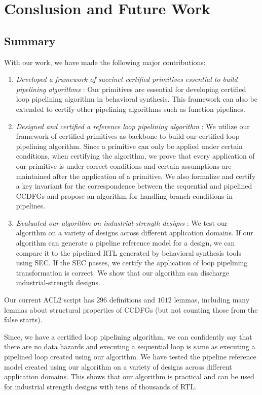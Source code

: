 \section{Conslusion and Future Work}
\label{sec:research-plan}

\subsection{Summary}
With our work, we have made the following major contributions:
\begin{enumerate}
\item {\em Developed a framework of succinct certified primitives essential to build pipelining algorithms} : Our primitives are essential for developing certified loop pipelining algorithm in behavioral synthesis. This framework can also be extended to certify other pipelining algorithms such as function pipelines.
\item {\em Designed and certified a reference loop pipelining algorithm} : We utilize our framework of certified primitives as backbone to build our certified loop pipelining algorithm. Since a primitive can only be applied under certain conditions, when certifying the algorithm, we prove that every application of our primitive is under correct conditions and certain assumptions are maintained after the application of a primitive. We also formalize and certify a key invariant for the correspondence between the sequential and pipelined CCDFGs and propose an algorithm for handling branch conditions in pipelines.
\item {\em Evaluated our algorithm on industrial-strength designs} : We test our algorithm on a variety of designs across different application domains. If our algorithm can generate a pipeline reference model for a design, we can compare it to the pipelined RTL generated by behavioral synthesis tools using SEC. If the SEC passes, we certify the application of loop pipelining transformation is correct. We show that our algorithm can discharge industrial-strength designs.
\end{enumerate} 

Our current ACL2 script has $296$ definitions and $1012$ lemmas, including many lemmas about structural properties of CCDFGs (but not counting those from the false starts). 

Since, we have a certified loop pipelining algorithm, we can confidently say that there are no data hazards and executing a sequential loop is same as executing a pipelined loop created using our algorithm. We have tested the pipeline reference model created using our algorithm on a variety of designs across different application domains. This shows that our algorithm is practical and can be used for industrial strength designs with tens of thousands of RTL. 

